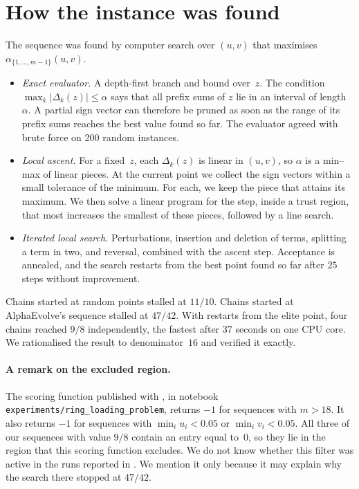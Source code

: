 \documentclass[11pt]{article}
\theoremstyle{plain}
\theoremstyle{definition}
\theoremstyle{remark}
\begin{document}
\section{How the instance was found}\label{sec:search}

The sequence was found by computer search over $(u,v)$ that maximises $\alpha_{\{1,\dots,m-1\}}(u,v)$.
\begin{itemize}[leftmargin=*]
\item \emph{Exact evaluator.} A depth-first branch and bound over~$z$. The condition $\max_k|\Delta_k(z)|\le\alpha$ says that all prefix sums of $z$ lie in an interval of length~$\alpha$. A partial sign vector can therefore be pruned as soon as the range of its prefix sums reaches the best value found so far. The evaluator agreed with brute force on 200 random instances.
\item \emph{Local ascent.} For a fixed~$z$, each $\Delta_k(z)$ is linear in $(u,v)$, so $\alpha$ is a min--max of linear pieces. At the current point we collect the sign vectors within a small tolerance of the minimum. For each, we keep the piece that attains its maximum. We then solve a linear program for the step, inside a trust region, that most increases the smallest of these pieces, followed by a line search.
\item \emph{Iterated local search.} Perturbations, insertion and deletion of terms, splitting a term in two, and reversal, combined with the ascent step. Acceptance is annealed, and the search restarts from the best point found so far after $25$ steps without improvement.
\end{itemize}
Chains started at random points stalled at $11/10$. Chains started at AlphaEvolve's sequence stalled at $47/42$. With restarts from the elite point, four chains reached $9/8$ independently, the fastest after $37$ seconds on one CPU core. We rationalised the result to denominator~$16$ and verified it exactly.

\paragraph{A remark on the excluded region.}
The scoring function published with \cite{AERepo}, in notebook \texttt{experiments/ring\_loading\_problem}, returns $-1$ for sequences with $m>18$. It also returns $-1$ for sequences with $\min_iu_i<0.05$ or $\min_iv_i<0.05$.
All three of our sequences with value $9/8$ contain an entry equal to~$0$, so they lie in the region that this scoring function excludes.
We do not know whether this filter was active in the runs reported in \cite{GGTW25}. We mention it only because it may explain why the search there stopped at $47/42$.
\end{document}
